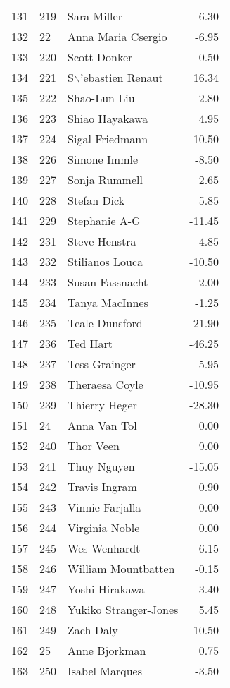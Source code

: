 \begin{table}[ht]
\begin{tabular}{rllr}
  131 & 219 & Sara Miller & 6.30 \\ 
  132 & 22 & Anna Maria Csergio & -6.95 \\ 
  133 & 220 & Scott Donker & 0.50 \\ 
  134 & 221 & S$\backslash$'ebastien Renaut & 16.34 \\ 
  135 & 222 & Shao-Lun Liu & 2.80 \\ 
  136 & 223 & Shiao Hayakawa & 4.95 \\ 
  137 & 224 & Sigal Friedmann & 10.50 \\ 
  138 & 226 & Simone Immle & -8.50 \\ 
  139 & 227 & Sonja Rummell & 2.65 \\ 
  140 & 228 & Stefan Dick & 5.85 \\ 
  141 & 229 & Stephanie A-G & -11.45 \\ 
  142 & 231 & Steve Henstra & 4.85 \\ 
  143 & 232 & Stilianos Louca & -10.50 \\ 
  144 & 233 & Susan Fassnacht & 2.00 \\ 
  145 & 234 & Tanya MacInnes & -1.25 \\ 
  146 & 235 & Teale Dunsford & -21.90 \\ 
  147 & 236 & Ted Hart & -46.25 \\ 
  148 & 237 & Tess Grainger & 5.95 \\ 
  149 & 238 & Theraesa Coyle & -10.95 \\ 
  150 & 239 & Thierry Heger & -28.30 \\ 
  151 & 24 & Anna Van Tol & 0.00 \\ 
  152 & 240 & Thor Veen & 9.00 \\ 
  153 & 241 & Thuy Nguyen & -15.05 \\ 
  154 & 242 & Travis Ingram & 0.90 \\ 
  155 & 243 & Vinnie Farjalla & 0.00 \\ 
  156 & 244 & Virginia Noble & 0.00 \\ 
  157 & 245 & Wes Wenhardt & 6.15 \\ 
  158 & 246 & William Mountbatten & -0.15 \\ 
  159 & 247 & Yoshi Hirakawa & 3.40 \\ 
  160 & 248 & Yukiko Stranger-Jones & 5.45 \\ 
  161 & 249 & Zach Daly & -10.50 \\ 
  162 & 25 & Anne Bjorkman & 0.75 \\ 
  163 & 250 & Isabel Marques & -3.50 \\ 

\end{tabular}
\end{table}
